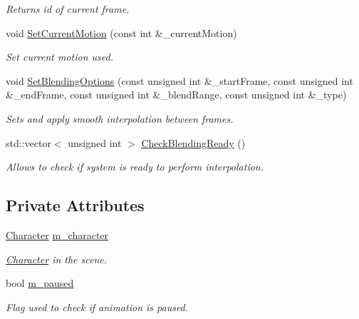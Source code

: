 \begin{DoxyCompactItemize}
\begin{DoxyCompactList}\small\item\em Returns id of current frame. \end{DoxyCompactList}\item 
void \hyperlink{class_b_v_h_scene_a80ff1747afdd88e875cef343eb5c6095}{Set\+Current\+Motion} (const int \&\+\_\+current\+Motion)
\begin{DoxyCompactList}\small\item\em Set current motion used. \end{DoxyCompactList}\item 
void \hyperlink{class_b_v_h_scene_af12c217beba32acb4db786a9f8a113ab}{Set\+Blending\+Options} (const unsigned int \&\+\_\+start\+Frame, const unsigned int \&\+\_\+end\+Frame, const unsigned int \&\+\_\+blend\+Range, const unsigned int \&\+\_\+type)
\begin{DoxyCompactList}\small\item\em Sets and apply smooth interpolation between frames. \end{DoxyCompactList}\item 
std\+::vector$<$ unsigned int $>$ \hyperlink{class_b_v_h_scene_a0e2e1d5b042853755999c5d5cb0f7f68}{Check\+Blending\+Ready} ()\hypertarget{class_b_v_h_scene_a0e2e1d5b042853755999c5d5cb0f7f68}{}\label{class_b_v_h_scene_a0e2e1d5b042853755999c5d5cb0f7f68}

\begin{DoxyCompactList}\small\item\em Allows to check if system is ready to perform interpolation. \end{DoxyCompactList}\end{DoxyCompactItemize}
\subsection*{Private Attributes}
\begin{DoxyCompactItemize}
\item 
\hyperlink{class_character}{Character} \hyperlink{class_b_v_h_scene_ac79e4e47ccc7d4cc5059e29fac68971a}{m\+\_\+character}\hypertarget{class_b_v_h_scene_ac79e4e47ccc7d4cc5059e29fac68971a}{}\label{class_b_v_h_scene_ac79e4e47ccc7d4cc5059e29fac68971a}

\begin{DoxyCompactList}\small\item\em \hyperlink{class_character}{Character} in the scene. \end{DoxyCompactList}\item 
bool \hyperlink{class_b_v_h_scene_a1c0d3cab2a3cd3ac534536340c189ae1}{m\+\_\+paused}\hypertarget{class_b_v_h_scene_a1c0d3cab2a3cd3ac534536340c189ae1}{}\label{class_b_v_h_scene_a1c0d3cab2a3cd3ac534536340c189ae1}

\begin{DoxyCompactList}\small\item\em Flag used to check if animation is paused. \end{DoxyCompactList}\end{DoxyCompactItemize}


